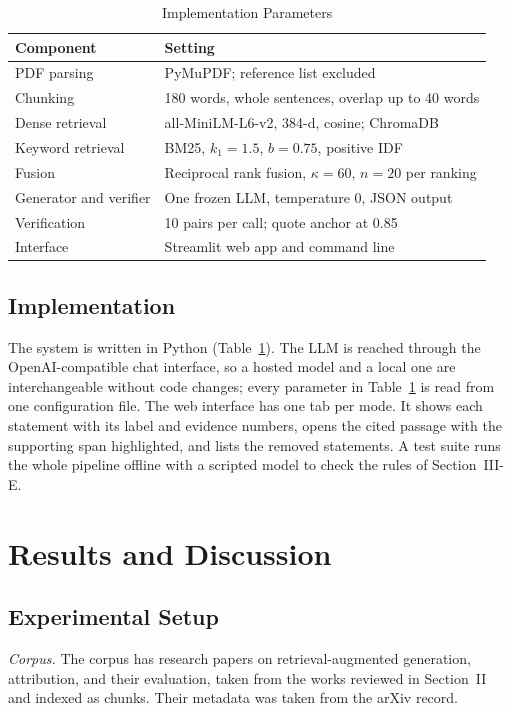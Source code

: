 \documentclass[10pt,twocolumn,letterpaper]{article}
\begin{document}
\begin{table}[t]
\caption{Implementation Parameters}
\label{tab:params}
\footnotesize
\begin{tabularx}{\columnwidth}{@{}lX@{}}
\toprule
Component & Setting\\
\midrule
PDF parsing & PyMuPDF; reference list excluded\\
Chunking & 180 words, whole sentences, overlap up to 40 words\\
Dense retrieval & all-MiniLM-L6-v2, 384-d, cosine; ChromaDB\\
Keyword retrieval & BM25, $k_1=1.5$, $b=0.75$, positive IDF\\
Fusion & Reciprocal rank fusion, $\kappa=60$, $n=20$ per ranking\\
Generator and verifier & One frozen LLM, temperature 0, JSON output\\
Verification & 10 pairs per call; quote anchor at 0.85\\
Interface & Streamlit web app and command line\\
\bottomrule
\end{tabularx}
\end{table}

\subsection{Implementation}
The system is written in Python (Table~\ref{tab:params}). The LLM is reached through the OpenAI-compatible chat interface, so a hosted model and a local one are interchangeable without code changes; every parameter in Table~\ref{tab:params} is read from one configuration file. The web interface has one tab per mode. It shows each statement with its label and evidence numbers, opens the cited passage with the supporting span highlighted, and lists the removed statements. A test suite runs the whole pipeline offline with a scripted model to check the rules of Section~III-E.

\section{Results and Discussion}
\ResNote
\subsection{Experimental Setup}
\emph{Corpus.} The corpus has \ResNPapers{} research papers on retrieval-augmented generation, attribution, and their evaluation, taken from the works reviewed in Section~II and indexed as \ResNChunks{} chunks. Their metadata was taken from the arXiv record.
\end{document}
